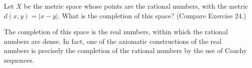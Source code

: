 \setcounter{exercise}{24}
\begin{exercise}
	Let $X$ be the metric space whose points are the rational numbers, with the metric $d(x,y) = |x-y|$. What is the completion of this space? (Compare Exercise 24.)
\end{exercise}
\begin{solution}
	The completion of this space is the real numbers, within which the rational numbers are dense. In fact, one of the axiomatic constructions of the real numbers is precisely the completion of the rational numbers by the use of Cauchy sequences.
\end{solution}
